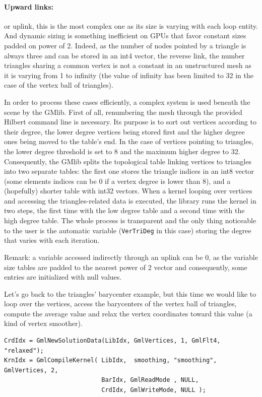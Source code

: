 \documentclass[a4paper,12pt]{article}
\begin{document}
\paragraph{Upward links:} or uplink, this is the most complex one as its size is varying with each loop entity. And dynamic sizing is something inefficient on GPUs that favor constant sizes padded on power of 2. Indeed, as the number of nodes pointed by a triangle is always three and can be stored in an int4 vector, the reverse link, the number triangles sharing a common vertex is not a constant in an unstructured mesh as it is varying from 1 to infinity (the value of infinity has been limited to 32 in the case of the vertex ball of triangles).

In order to process these cases efficiently, a complex system is used beneath the scene by the GMlib. First of all, renumbering the mesh through the provided Hilbert command line is necessary. Its purpose is to sort out vertices according to their degree, the lower degree vertices being stored first and the higher degree ones being moved to the table's end. In the case of vertices pointing to triangles, the lower degree threshold is set to 8 and the maximum higher degree to 32. Consequently, the GMlib splits the topological table linking vertices to triangles into two separate tables: the first one stores the triangle indices in an int8 vector (some elements indices can be $0$ if a vertex degree is lower than 8), and a (hopefully) shorter table with int32 vectors. When a kernel looping over vertices and accessing the triangles-related data is executed, the library runs the kernel in two steps, the first time with the low degree table and a second time with the high degree table. The whole process is transparent and the only thing noticeable to the user is the automatic variable ({\tt VerTriDeg} in this case) storing the degree that varies with each iteration.

Remark: a variable accessed indirectly through an uplink can be $0$, as the variable size tables are padded to the nearest power of 2 vector and consequently, some entries are initialized with null values.

Let's go back to the triangles' barycenter example, but this time we would like to loop over the vertices, access the barycenters of the vertex ball of triangles, compute the average value and relax the vertex coordinates toward this value (a kind of vertex smoother).

\begin{tt}
\begin{verbatim}
CrdIdx = GmlNewSolutionData(LibIdx, GmlVertices, 1, GmlFlt4, "relaxed");
KrnIdx = GmlCompileKernel( LibIdx,  smoothing, "smoothing", GmlVertices, 2,
                           BarIdx, GmlReadMode , NULL,
                           CrdIdx, GmlWriteMode, NULL );
\end{verbatim}
\end{tt}
\normalfont
\end{document}
